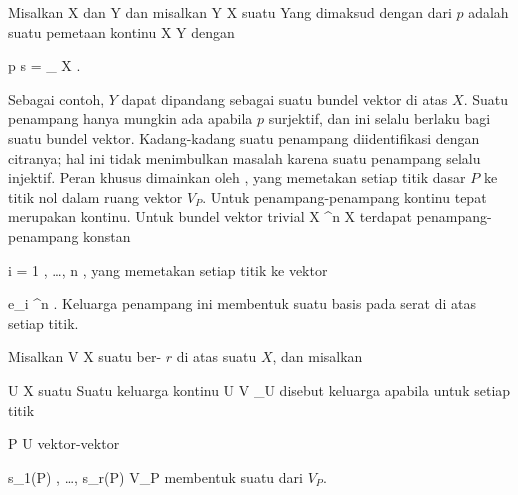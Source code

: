 {}
{

Misalkan
\mathkor {} {X} {dan} {Y} {}
dan misalkan
 { Y } { X
} {}
suatu
Yang dimaksud dengan
dari $p$ adalah suatu pemetaan kontinu
 { X } { Y
} {}
dengan

\mavergleichskettedisp
{\vergleichskette
{  p \circ s
}
{ =} {
_{  X  }
}
{ } {
}
{ } {
}
{ } {
}
}
{}{}{.}

}
Sebagai contoh, $Y$ dapat dipandang sebagai suatu bundel vektor di atas $X$. Suatu penampang hanya mungkin ada apabila $p$ surjektif, dan ini selalu berlaku bagi suatu bundel vektor. Kadang-kadang suatu penampang diidentifikasi dengan citranya; hal ini tidak menimbulkan masalah karena suatu penampang selalu injektif. Peran khusus dimainkan oleh  {,} yang memetakan setiap titik dasar $P$ ke titik nol dalam ruang vektor $V_P$.
Untuk
penampang-penampang kontinu tepat merupakan
kontinu. Untuk bundel vektor trivial
\maabbdisp {} {X \times \R^n } { X
} {}
terdapat penampang-penampang konstan

 {}
 {i = 1 , \ldots , n} {}
 {} {} {} {,}
yang memetakan setiap titik ke vektor

\mavergleichskette
{\vergleichskette
{ e_i
}
{ \in }{ \R^n
}
{  }{
}
{    }{
}
{   }{
}
}
{}{}{}
. Keluarga penampang ini membentuk suatu basis pada serat di atas setiap titik.

Misalkan
 { V } { X
} {}
suatu
ber-
$r$ di atas suatu
$X$, dan misalkan

\mavergleichskette
{\vergleichskette
{ U
}
{ \subseteq }{ X
}
{  }{
}
{    }{
}
{   }{
}
}
{}{}{}
suatu
Suatu keluarga
kontinu
 { U} {V  \vert_U
} {}
disebut keluarga
apabila untuk setiap titik

\mavergleichskette
{\vergleichskette
{ P
}
{ \in }{ U
}
{  }{
}
{    }{
}
{   }{
}
}
{}{}{}
vektor-vektor

\mavergleichskette
{\vergleichskette
{ s_1(P)  , \ldots , s_r(P)
}
{ \in }{ V_P
}
{  }{
}
{    }{
}
{   }{
}
}
{}{}{}
membentuk suatu
dari $V_P$.

